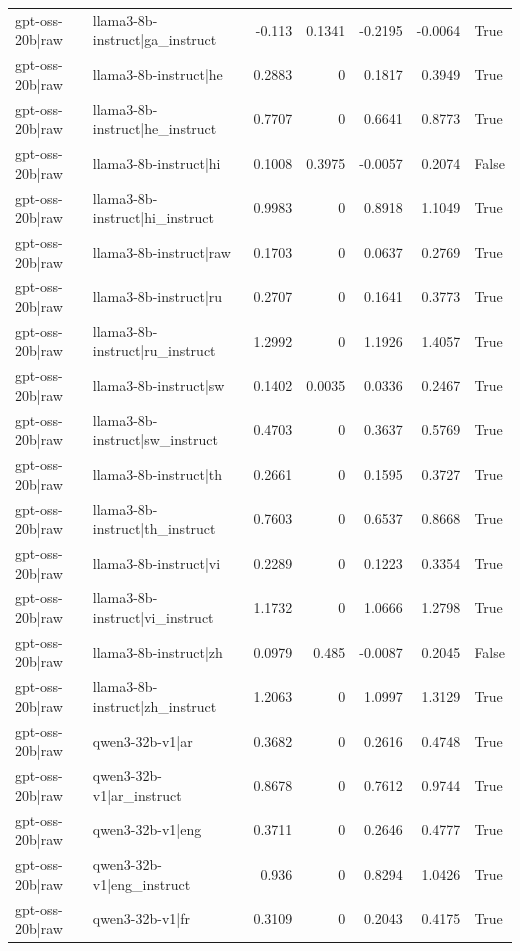 \begin{table}
\begin{tabular}{l l r r r r l}
gpt-oss-20b|raw & llama3-8b-instruct|ga_instruct & -0.113 & 0.1341 & -0.2195 & -0.0064 & True \\
gpt-oss-20b|raw & llama3-8b-instruct|he & 0.2883 & 0 & 0.1817 & 0.3949 & True \\
gpt-oss-20b|raw & llama3-8b-instruct|he_instruct & 0.7707 & 0 & 0.6641 & 0.8773 & True \\
gpt-oss-20b|raw & llama3-8b-instruct|hi & 0.1008 & 0.3975 & -0.0057 & 0.2074 & False \\
gpt-oss-20b|raw & llama3-8b-instruct|hi_instruct & 0.9983 & 0 & 0.8918 & 1.1049 & True \\
gpt-oss-20b|raw & llama3-8b-instruct|raw & 0.1703 & 0 & 0.0637 & 0.2769 & True \\
gpt-oss-20b|raw & llama3-8b-instruct|ru & 0.2707 & 0 & 0.1641 & 0.3773 & True \\
gpt-oss-20b|raw & llama3-8b-instruct|ru_instruct & 1.2992 & 0 & 1.1926 & 1.4057 & True \\
gpt-oss-20b|raw & llama3-8b-instruct|sw & 0.1402 & 0.0035 & 0.0336 & 0.2467 & True \\
gpt-oss-20b|raw & llama3-8b-instruct|sw_instruct & 0.4703 & 0 & 0.3637 & 0.5769 & True \\
gpt-oss-20b|raw & llama3-8b-instruct|th & 0.2661 & 0 & 0.1595 & 0.3727 & True \\
gpt-oss-20b|raw & llama3-8b-instruct|th_instruct & 0.7603 & 0 & 0.6537 & 0.8668 & True \\
gpt-oss-20b|raw & llama3-8b-instruct|vi & 0.2289 & 0 & 0.1223 & 0.3354 & True \\
gpt-oss-20b|raw & llama3-8b-instruct|vi_instruct & 1.1732 & 0 & 1.0666 & 1.2798 & True \\
gpt-oss-20b|raw & llama3-8b-instruct|zh & 0.0979 & 0.485 & -0.0087 & 0.2045 & False \\
gpt-oss-20b|raw & llama3-8b-instruct|zh_instruct & 1.2063 & 0 & 1.0997 & 1.3129 & True \\
gpt-oss-20b|raw & qwen3-32b-v1|ar & 0.3682 & 0 & 0.2616 & 0.4748 & True \\
gpt-oss-20b|raw & qwen3-32b-v1|ar_instruct & 0.8678 & 0 & 0.7612 & 0.9744 & True \\
gpt-oss-20b|raw & qwen3-32b-v1|eng & 0.3711 & 0 & 0.2646 & 0.4777 & True \\
gpt-oss-20b|raw & qwen3-32b-v1|eng_instruct & 0.936 & 0 & 0.8294 & 1.0426 & True \\
gpt-oss-20b|raw & qwen3-32b-v1|fr & 0.3109 & 0 & 0.2043 & 0.4175 & True \\

\end{tabular}
\end{table}
